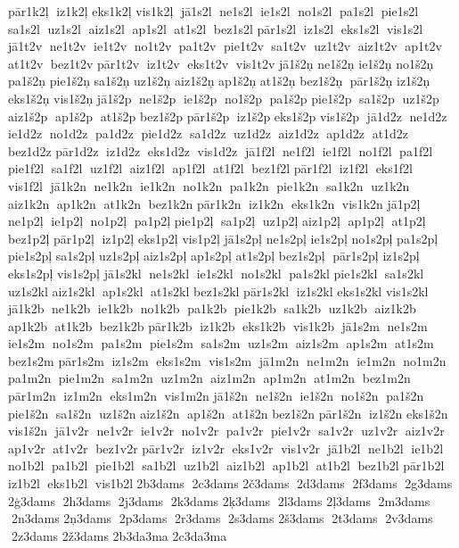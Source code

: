  pār1k2ļ  iz1k2ļ 	 eks1k2ļ 	 vis1k2ļ  jā1s2l  ne1s2l  ie1s2l  no1s2l  pa1s2l  pie1s2l  sa1s2l  uz1s2l  aiz1s2l  ap1s2l  at1s2l  bez1s2l 	 pār1s2l  iz1s2l  eks1s2l  vis1s2l  jā1t2v  ne1t2v  ie1t2v  no1t2v  pa1t2v  pie1t2v  sa1t2v  uz1t2v  aiz1t2v  ap1t2v  at1t2v  bez1t2v 	 pār1t2v  iz1t2v  eks1t2v  vis1t2v 
 jā1š2ņ 	 ne1š2ņ 	 ie1š2ņ 	 no1š2ņ 	 pa1š2ņ 
 pie1š2ņ 	 sa1š2ņ 	 uz1š2ņ 
 aiz1š2ņ 	 ap1š2ņ 	 at1š2ņ 
 bez1š2ņ  pār1š2ņ 	 iz1š2ņ 
 eks1š2ņ 
 vis1š2ņ 	 jā1š2p  ne1š2p  ie1š2p  no1š2p  pa1š2p 	 pie1š2p  sa1š2p  uz1š2p 	 aiz1š2p  ap1š2p  at1š2p 	 bez1š2p 
 pār1š2p  iz1š2p 	 eks1š2p 	 vis1š2p  jā1d2z  ne1d2z  ie1d2z  no1d2z  pa1d2z  pie1d2z  sa1d2z  uz1d2z  aiz1d2z  ap1d2z  at1d2z  bez1d2z 	 pār1d2z  iz1d2z  eks1d2z  vis1d2z  jā1f2l  ne1f2l  ie1f2l  no1f2l  pa1f2l  pie1f2l  sa1f2l  uz1f2l  aiz1f2l  ap1f2l  at1f2l  bez1f2l 	 pār1f2l  iz1f2l  eks1f2l  vis1f2l  jā1k2n  ne1k2n  ie1k2n  no1k2n  pa1k2n  pie1k2n  sa1k2n  uz1k2n  aiz1k2n  ap1k2n  at1k2n  bez1k2n 	 pār1k2n  iz1k2n  eks1k2n  vis1k2n 	 jā1p2ļ  ne1p2ļ  ie1p2ļ  no1p2ļ  pa1p2ļ 	 pie1p2ļ  sa1p2ļ  uz1p2ļ 	 aiz1p2ļ  ap1p2ļ  at1p2ļ 	 bez1p2ļ 
 pār1p2ļ  iz1p2ļ 	 eks1p2ļ 	 vis1p2ļ 
 jā1s2pļ 	 ne1s2pļ 	 ie1s2pļ 	 no1s2pļ 	 pa1s2pļ 
 pie1s2pļ 	 sa1s2pļ 	 uz1s2pļ 
 aiz1s2pļ 	 ap1s2pļ 	 at1s2pļ 
 bez1s2pļ  pār1s2pļ 	 iz1s2pļ 
 eks1s2pļ 
 vis1s2pļ 	 jā1s2kl  ne1s2kl  ie1s2kl  no1s2kl  pa1s2kl 	 pie1s2kl  sa1s2kl  uz1s2kl 	 aiz1s2kl  ap1s2kl  at1s2kl 	 bez1s2kl 
 pār1s2kl  iz1s2kl 	 eks1s2kl 	 vis1s2kl  jā1k2b  ne1k2b  ie1k2b  no1k2b  pa1k2b  pie1k2b  sa1k2b  uz1k2b  aiz1k2b  ap1k2b  at1k2b  bez1k2b 	 pār1k2b  iz1k2b  eks1k2b  vis1k2b  jā1s2m  ne1s2m  ie1s2m  no1s2m  pa1s2m  pie1s2m  sa1s2m  uz1s2m  aiz1s2m  ap1s2m  at1s2m  bez1s2m 	 pār1s2m  iz1s2m  eks1s2m  vis1s2m  jā1m2n  ne1m2n  ie1m2n  no1m2n  pa1m2n  pie1m2n  sa1m2n  uz1m2n  aiz1m2n  ap1m2n  at1m2n  bez1m2n 	 pār1m2n  iz1m2n  eks1m2n  vis1m2n 	 jā1š2n  ne1š2n  ie1š2n  no1š2n  pa1š2n 	 pie1š2n  sa1š2n  uz1š2n 	 aiz1š2n  ap1š2n  at1š2n 	 bez1š2n 
 pār1š2n  iz1š2n 	 eks1š2n 	 vis1š2n  jā1v2r  ne1v2r  ie1v2r  no1v2r  pa1v2r  pie1v2r  sa1v2r  uz1v2r  aiz1v2r  ap1v2r  at1v2r  bez1v2r 	 pār1v2r  iz1v2r  eks1v2r  vis1v2r  jā1b2l  ne1b2l  ie1b2l  no1b2l  pa1b2l  pie1b2l  sa1b2l  uz1b2l  aiz1b2l  ap1b2l  at1b2l  bez1b2l 	 pār1b2l  iz1b2l  eks1b2l  vis1b2l 2b3dams  2c3dams  	2č3dams  2d3dams  2f3dams  2g3dams  	2ģ3dams  2h3dams  2j3dams  2k3dams  	2ķ3dams  2l3dams  	2ļ3dams  2m3dams  2n3dams  	2ņ3dams  2p3dams  2r3dams  2s3dams  	2š3dams  2t3dams  2v3dams  2z3dams  	2ž3dams  	2b3da3ma  	2c3da3ma  
